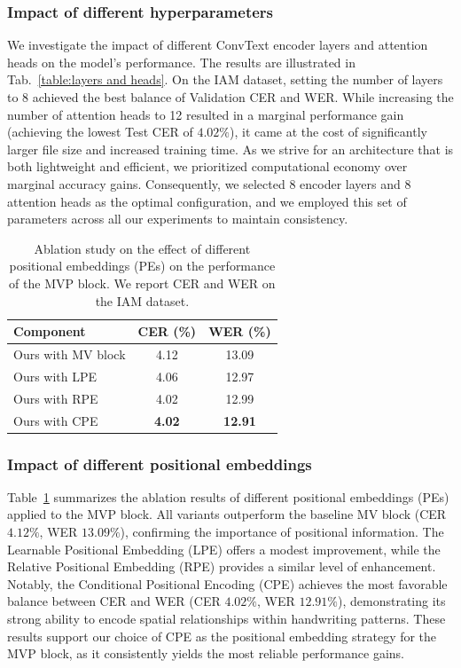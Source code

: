 \documentclass[final,5p,times]{elsarticle}
\begin{document}
\subsubsection{Impact of different hyperparameters}
We investigate the impact of different ConvText encoder layers and attention heads on the model's performance.
The results are illustrated in Tab.~\ref{table:layers and heads}. On the IAM dataset, setting the number of layers to 8 achieved the best balance of Validation CER and WER. While increasing the number of attention heads to 12 resulted in a marginal performance gain (achieving the lowest Test CER of $4.02\%$), it came at the cost of significantly larger file size and increased training time. As we strive for an architecture that is both lightweight and efficient, we prioritized computational economy over marginal accuracy gains. Consequently, we selected 8 encoder layers and 8 attention heads as the optimal configuration, and we employed this set of parameters across all our experiments to maintain consistency.
\begin{table}[!t]
\centering
\caption{Ablation study on the effect of different positional embeddings (PEs) on the performance of the MVP block. We report CER and WER on the IAM dataset.}
\label{table:pe}
\begin{tabular}{lcc}
\hline
\textbf{Component} & \textbf{CER (\%)} & \textbf{WER (\%)} \\
\hline
Ours with MV block & 4.12 & 13.09 \\
Ours with LPE &  4.06 & 12.97 \\
Ours with RPE & 4.02 & 12.99 \\
Ours with CPE & \textbf{4.02} & \textbf{12.91} \\
\hline
\end{tabular}
\end{table}

\subsubsection{Impact of different positional embeddings}
Table~\ref{table:pe} summarizes the ablation results of different positional embeddings (PEs) applied to the MVP block. All variants outperform the baseline MV block (CER $4.12\%$, WER $13.09\%$), confirming the importance of positional information. The Learnable Positional Embedding (LPE) offers a modest improvement, while the Relative Positional Embedding \cite{rpe} (RPE) provides a similar level of enhancement. Notably, the Conditional Positional Encoding (CPE) achieves the most favorable balance between CER and WER (CER $4.02\%$, WER $12.91\%$), demonstrating its strong ability to encode spatial relationships within handwriting patterns. These results support our choice of CPE as the positional embedding strategy for the MVP block, as it consistently yields the most reliable performance gains.
\end{document}
